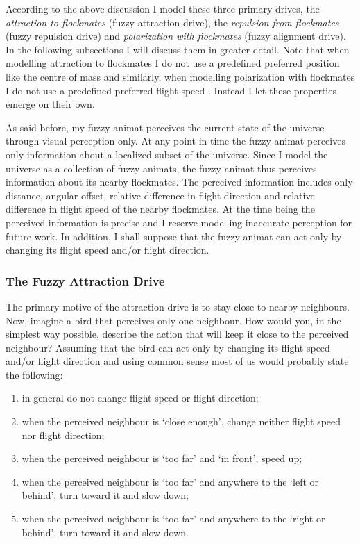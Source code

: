 According to the above discussion I model these three primary drives, the \emph{attraction to flockmates} (fuzzy attraction drive), the \emph{repulsion from flockmates} (fuzzy repulsion drive) and \emph{polarization with flockmates} (fuzzy alignment drive). In the following subsections I will discuss them in greater detail. Note that when modelling attraction to flockmates I do not use a predefined preferred position like the centre of mass \cite{reynolds:1987} and similarly, when modelling polarization with flockmates I do not use a predefined preferred flight speed \cite{heppner:1990}. Instead I let these properties emerge on their own. 

As said before, my fuzzy animat perceives the current state of the universe through visual perception only. At any point in time the fuzzy animat perceives only information about a localized subset of the universe. Since I model the universe as a collection of fuzzy animats, the fuzzy animat thus perceives information about its nearby flockmates. The perceived information includes only distance, angular offset, relative difference in flight direction and relative difference in flight speed of the nearby flockmates. At the time being the perceived information is precise and I reserve modelling inaccurate perception for future work. In addition, I shall suppose that the fuzzy animat can act only by changing its flight speed and/or flight direction.

\subsubsection{The Fuzzy Attraction Drive}
The primary motive of the attraction drive is to stay close to nearby neighbours. Now, imagine a bird that perceives only one neighbour. How would you, in the simplest way possible, describe the action that will keep it close to the perceived neighbour? Assuming that the bird can act only by changing its flight speed and/or flight direction and using common sense most of us would probably state the following:
\begin{enumerate}
\item in general do not change flight speed or flight direction; \label{dscr:attraction}
\item when the perceived neighbour is `close enough', change neither flight speed nor flight direction;
\item when the perceived neighbour is `too far' and `in front', speed up;
\item when the perceived neighbour is `too far' and anywhere to the `left or behind', turn toward it and slow down;
\item when the perceived neighbour is `too far' and anywhere to the `right or behind', turn toward it and slow down.
\end{enumerate}

